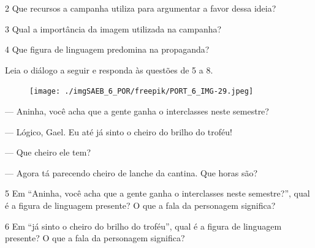 
\num{2} Que recursos a campanha utiliza para argumentar a favor dessa
ideia?


\num{3} Qual a importância da imagem utilizada na campanha?


\num{4} Que figura de linguagem predomina na propaganda?



Leia o diálogo a seguir e responda às questões de 5 a 8.
\enlargethispage{3\baselineskip}

\begin{myquote}
\begin{figure}[H]
\centering\texttt{[image: ./imgSAEB\_6\_POR/freepik/PORT\_6\_IMG-29.jpeg]}
\end{figure}

--- Aninha, você acha que a gente ganha o interclasses neste semestre?

\noindent --- Lógico, Gael. Eu até já sinto o cheiro do brilho do troféu!

\noindent --- Que cheiro ele tem?

\noindent --- Agora tá parecendo cheiro de lanche da cantina. Que horas são?
\end{myquote}

\pagebreak
\num{5} Em ``Aninha, você acha que a gente ganha o interclasses neste
semestre?'', qual é a figura de linguagem presente? O que a fala da
personagem significa?


\num{6} Em ``já sinto o cheiro do brilho do troféu'', qual é a figura de
linguagem presente? O que a fala da personagem significa?


